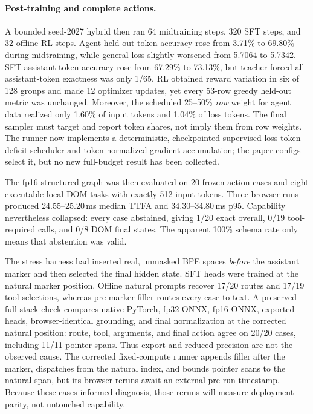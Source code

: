 \documentclass{article}
\begin{document}
\paragraph{Post-training and complete actions.}
A bounded seed-2027 hybrid then ran 64 midtraining steps, 320 SFT steps, and 32 offline-RL steps.
Agent held-out token accuracy rose from 3.71\% to 69.80\% during midtraining, while general loss
slightly worsened from 5.7064 to 5.7342.  SFT assistant-token accuracy rose from 67.29\% to
73.13\%, but teacher-forced all-assistant-token exactness was only 1/65.  RL obtained reward
variation in six of 128 groups and made 12 optimizer updates, yet every 53-row greedy held-out
metric was unchanged.  Moreover, the scheduled 25--50\% \emph{row} weight for agent data realized
only 1.60\% of input tokens and 1.04\% of loss tokens.  The final sampler must target and report
token shares, not imply them from row weights.  The runner now implements a deterministic,
checkpointed supervised-loss-token deficit scheduler and token-normalized gradient accumulation;
the paper configs select it, but no new full-budget result has been collected.

The fp16 structured graph was then evaluated on 20 frozen action cases and eight executable local
DOM tasks with exactly 512 input tokens.  Three browser runs produced 24.55--25.20\,ms median TTFA
and 34.30--34.80\,ms p95.  Capability nevertheless collapsed: every case abstained, giving 1/20
exact overall, 0/19 tool-required calls, and 0/8 DOM final states.  The apparent 100\% schema rate
only means that abstention was valid.

The stress harness had inserted real, unmasked BPE spaces \emph{before} the assistant marker and
then selected the final hidden state.  SFT heads were trained at the natural marker position.
Offline natural prompts recover 17/20 routes and 17/19 tool selections, whereas pre-marker filler
routes every case to text.  A preserved full-stack check compares native PyTorch, fp32 ONNX, fp16
ONNX, exported heads, browser-identical grounding, and final normalization at the corrected
natural position: route, tool, arguments, and final action agree on 20/20 cases, including 11/11
pointer spans.  Thus export and reduced precision are not the observed cause.  The corrected
fixed-compute runner appends filler after the marker, dispatches from the natural index, and
bounds pointer scans to the natural span, but its browser reruns await an external pre-run
timestamp.  Because these cases informed diagnosis, those reruns will measure deployment parity,
not untouched capability.
\end{document}

